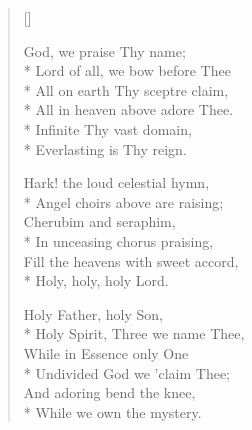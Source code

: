 \newHymn
{}

\begin{verse}[\versewidth]
\begin{patverse}
 God, we praise Thy name;\\*
Lord of all, we bow before Thee\\*
All on earth Thy sceptre claim,\\*
All in heaven above adore Thee.\\*
Infinite Thy vast domain,\\*
Everlasting is Thy reign.
\end{patverse}

\begin{patverse}
Hark! the loud celestial hymn,\\*
Angel choirs above are raising;\\
Cherubim and seraphim,\\*
In unceasing chorus praising,\\
Fill the heavens with sweet accord,\\*
Holy, holy, holy Lord.
\end{patverse}


\begin{patverse}
Holy Father, holy Son,\\*
Holy Spirit, Three we name Thee,\\
While in Essence only One\\*
Undivided God we 'claim Thee;\\
And adoring bend the knee,\\*
While we own the mystery.
\end{patverse}

\end{verse}


